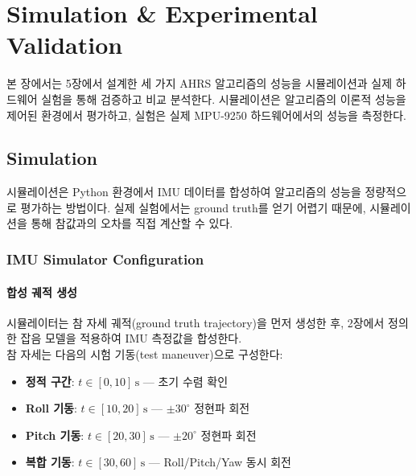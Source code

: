 \section{Simulation \& Experimental Validation}
    본 장에서는 5장에서 설계한 세 가지 AHRS 알고리즘의 성능을 시뮬레이션과 실제 하드웨어 실험을 통해 검증하고 비교 분석한다. 시뮬레이션은 알고리즘의 이론적 성능을 제어된 환경에서 평가하고, 실험은 실제 MPU-9250 하드웨어에서의 성능을 측정한다.\\

    \subsection{Simulation}
        시뮬레이션은 Python 환경에서 IMU 데이터를 합성하여 알고리즘의 성능을 정량적으로 평가하는 방법이다. 실제 실험에서는 ground truth를 얻기 어렵기 때문에, 시뮬레이션을 통해 참값과의 오차를 직접 계산할 수 있다.\\

        \subsubsection{IMU Simulator Configuration}
            \paragraph{합성 궤적 생성}
                시뮬레이터는 참 자세 궤적(ground truth trajectory)을 먼저 생성한 후, 2장에서 정의한 잡음 모델을 적용하여 IMU 측정값을 합성한다.\\

                참 자세는 다음의 시험 기동(test maneuver)으로 구성한다:\\
    
                \begin{itemize}
                    \item \textbf{정적 구간}: $t \in [0, 10]\,\text{s}$ — 초기 수렴 확인
                    \item \textbf{Roll 기동}: $t \in [10, 20]\,\text{s}$ — $\pm 30^\circ$ 정현파 회전
                    \item \textbf{Pitch 기동}: $t \in [20, 30]\,\text{s}$ — $\pm 20^\circ$ 정현파 회전
                    \item \textbf{복합 기동}: $t \in [30, 60]\,\text{s}$ — Roll/Pitch/Yaw 동시 회전
                \end{itemize}

